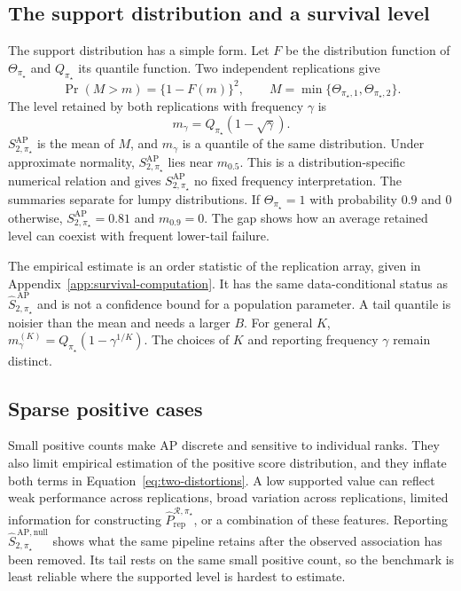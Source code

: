 \documentclass[11pt]{article}
\newcommand{\Regime}{\mathcal{R}}
\newcommand{\SAP}{S_{2,\pi_\star}^{\mathrm{AP}}}
\newcommand{\SAPHat}{\widehat S_{2,\pi_\star}^{\,\mathrm{AP}}}
\newcommand{\SAPnullHat}{\widehat S_{2,\pi_\star}^{\,\mathrm{AP,null}}}
\newcommand{\PRepHat}{\widehat{P}_{\mathrm{rep}}^{\Regime,\pi_\star}}
\theoremstyle{remark}
\begin{document}
\subsection{The support distribution and a survival level}
\label{sec:survival}

The support distribution has a simple form. Let $F$ be the distribution function of $\Theta_{\pi_\star}$ and $Q_{\pi_\star}$ its quantile function. Two independent replications give
\[
\Pr(M>m)=\{1-F(m)\}^2,
\qquad
M=\min\{\Theta_{\pi_\star,1},\Theta_{\pi_\star,2}\}.
\]
The level retained by both replications with frequency $\gamma$ is
\begin{equation}
m_\gamma=Q_{\pi_\star}(1-\sqrt{\gamma}).
\label{eq:survival-level}
\end{equation}
$\SAP$ is the mean of $M$, and $m_\gamma$ is a quantile of the same distribution. Under approximate normality, $\SAP$ lies near $m_{0.5}$. This is a distribution-specific numerical relation and gives $\SAP$ no fixed frequency interpretation. The summaries separate for lumpy distributions. If $\Theta_{\pi_\star}=1$ with probability $0.9$ and $0$ otherwise, $\SAP=0.81$ and $m_{0.9}=0$. The gap shows how an average retained level can coexist with frequent lower-tail failure.

The empirical estimate is an order statistic of the replication array, given in Appendix~\ref{app:survival-computation}. It has the same data-conditional status as $\SAPHat$ and is not a confidence bound for a population parameter. A tail quantile is noisier than the mean and needs a larger $B$. For general $K$, $m_\gamma^{(K)}=Q_{\pi_\star}(1-\gamma^{1/K})$. The choices of $K$ and reporting frequency $\gamma$ remain distinct.

\subsection{Sparse positive cases}
\label{sec:sparse}

Small positive counts make AP discrete and sensitive to individual ranks. They also limit empirical estimation of the positive score distribution, and they inflate both terms in Equation~\eqref{eq:two-distortions}. A low supported value can reflect weak performance across replications, broad variation across replications, limited information for constructing $\PRepHat$, or a combination of these features. Reporting $\SAPnullHat$ shows what the same pipeline retains after the observed association has been removed. Its tail rests on the same small positive count, so the benchmark is least reliable where the supported level is hardest to estimate.
\end{document}
